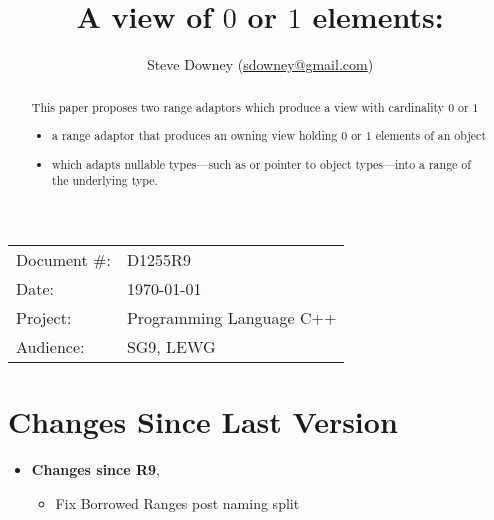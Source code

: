 \documentclass[a4paper,10pt,oneside,openany,final,article]{memoir}
\begin{document}
\title{A view of $0$ or $1$ elements: }
\author{
Steve Downey \small(\href{mailto:sdowney@gmail.com}{sdowney@gmail.com}) \\
}
\date{} %
\maketitle

\begin{flushright}
\begin{tabular}{ll}
  Document \#: & D1255R9 \\
  Date: & \today \\
  Project: & Programming Language C++ \\
  Audience: & SG9, LEWG
\end{tabular}
\end{flushright}

\begin{abstract}
  This paper proposes two range adaptors which produce a view with cardinality $0$ or $1$
  \begin{itemize}
  \item
     a range adaptor that produces an owning view holding $0$ or $1$ elements of an object
  \item
     which adapts nullable types---such as  or pointer to object types---into a range of the underlying type.
  \end{itemize}
\end{abstract}

\tableofcontents*

\chapter*{Changes Since Last Version}

\begin{itemize}
\item \textbf{Changes since R9},
  \begin{itemize}
  \item Fix Borrowed Ranges post naming split
  \end{itemize}
\end{itemize}
\end{document}
